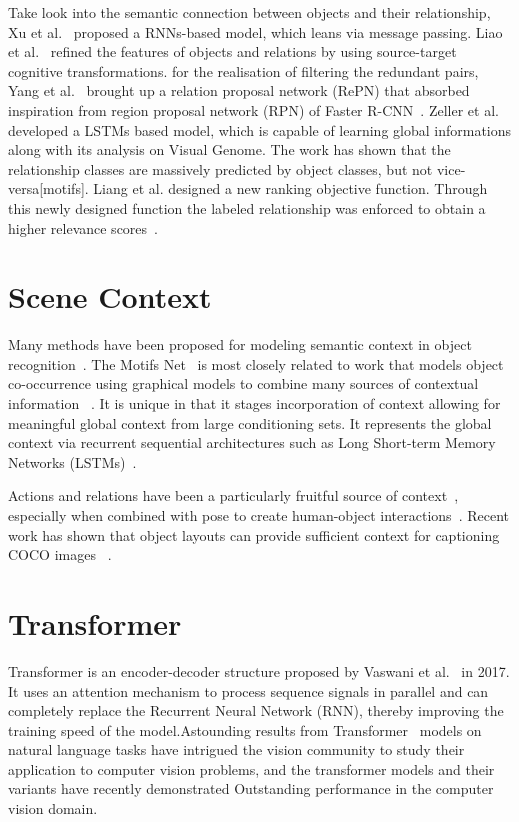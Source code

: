 Take look into the semantic connection between objects and their relationship, Xu et al.~\cite{xu2017scene} proposed a RNNs-based model,  which leans via message passing. Liao et al.~\cite{liao2019exploring} refined the features of objects and relations by using source-target cognitive transformations. for the realisation of filtering the redundant pairs, Yang et al.~\cite{yang2018graph} brought up a relation proposal network (RePN) that absorbed inspiration from region proposal network (RPN) of Faster R-CNN~\cite{ren2016faster}. Zeller et al.~\cite{zellers2018neural} developed a LSTMs based model, which is capable of learning global informations along with its analysis on Visual Genome. The work has shown that the relationship classes are massively predicted by object classes, but not vice-versa[motifs]. Liang et al. designed a new ranking objective function. Through this newly designed function the labeled relationship was enforced to obtain a higher relevance scores~\cite{liang2018visual}.

\section{Scene Context}
Many methods have been proposed for modeling semantic context in object recognition~\cite{divvala2009empirical}. The Motifs Net~\cite{zellers2018neural} is most closely related to work that models object co-occurrence using graphical models to combine many sources of contextual information ~\cite{rabinovich2007objects,belongie2007context}. It is unique in that it stages incorporation of context allowing for meaningful global context from large conditioning sets. It represents the global context via recurrent sequential architectures such as Long Short-term Memory Networks (LSTMs)~\cite{hochreiter1997long}.

Actions and relations have been a particularly fruitful source of context~\cite{marszalek2009actions,gupta2015visual}, especially when combined with pose to create human-object interactions~\cite{yao2010modeling}. Recent work has shown that object layouts can provide sufficient context for captioning COCO images ~\cite{lin2014microsoft}.

\section{Transformer}
Transformer is an encoder-decoder structure proposed by Vaswani et al.~\cite{vaswani2017attention} in 2017. It uses an attention mechanism to process sequence signals in parallel and can completely replace the Recurrent Neural Network (RNN), thereby improving the training speed of the model.Astounding results from Transformer~\cite{vaswani2017attention} models on natural language tasks have intrigued the vision community to study their application to computer vision problems, and the transformer models and their variants have recently demonstrated Outstanding performance in the computer vision domain. 

